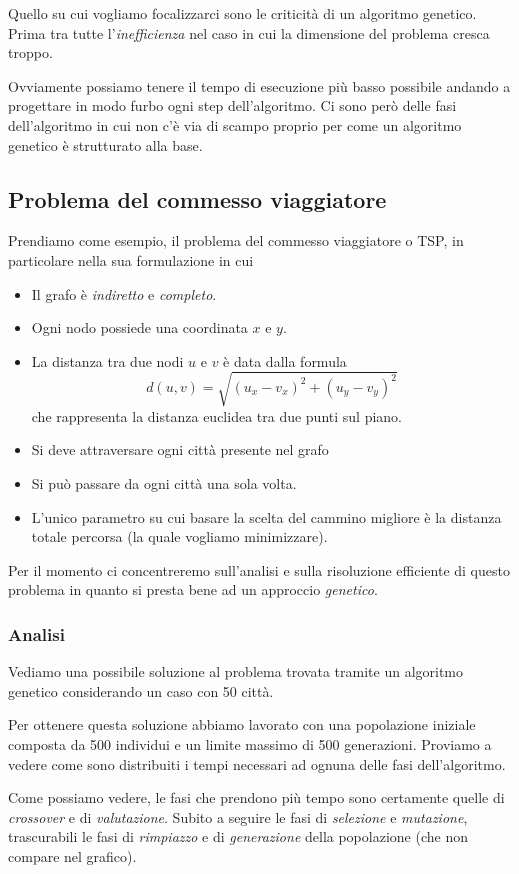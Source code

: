 Quello su cui vogliamo focalizzarci sono le criticità di un algoritmo genetico.
Prima tra tutte l'\emph{inefficienza} nel caso in cui la dimensione del
problema cresca troppo.

Ovviamente possiamo tenere il tempo di esecuzione più basso possibile andando
a progettare in modo furbo ogni step dell'algoritmo. Ci sono però delle fasi
dell'algoritmo in cui non c'è via di scampo proprio per come un algoritmo
genetico è strutturato alla base.

\subsection{Problema del commesso viaggiatore}

Prendiamo come esempio, il problema del commesso viaggiatore o TSP, in
particolare nella sua formulazione in cui
\begin{itemize}
	\item Il grafo è \emph{indiretto} e \emph{completo}.
	\item Ogni nodo possiede una coordinata $x$ e $y$.
	\item La distanza tra due nodi $u$ e $v$ è data dalla formula
	      \[ d(u, v) = \sqrt{(u_x - v_x)^2 + (u_y - v_y)^2} \]
	      che rappresenta la distanza euclidea tra due punti sul piano.
	\item Si deve attraversare ogni città presente nel grafo
	\item Si può passare da ogni città una sola volta.
	\item L'unico parametro su cui basare la scelta del cammino migliore è
	      la distanza totale percorsa (la quale vogliamo minimizzare).
\end{itemize}
Per il momento ci concentreremo sull'analisi e sulla risoluzione efficiente di
questo problema in quanto si presta bene ad un approccio \emph{genetico}.

\subsubsection{Analisi}

Vediamo una possibile soluzione al problema trovata tramite un algoritmo
genetico considerando un caso con 50 città.
\begin{center}
	
\end{center}
Per ottenere questa soluzione abbiamo lavorato con una popolazione iniziale
composta da 500 individui e un limite massimo di 500 generazioni. Proviamo a
vedere come sono distribuiti i tempi necessari ad ognuna delle fasi
dell'algoritmo.
\begin{center}
	
\end{center}
Come possiamo vedere, le fasi che prendono più tempo sono certamente quelle di
\emph{crossover} e di \emph{valutazione}. Subito a seguire le fasi di
\emph{selezione} e \emph{mutazione}, trascurabili le fasi di \emph{rimpiazzo} e
di \emph{generazione} della popolazione (che non compare nel grafico).

